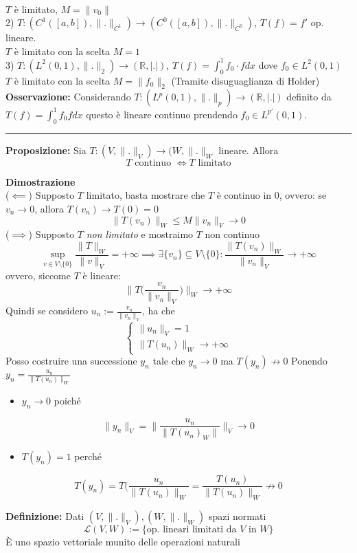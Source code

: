 \documentclass[a4paper]{article}
\newcommand{\R}{\mathbb{R}}
\newcommand{\divider}{\noindent\rule{\textwidth}{0.5pt}}
\begin{document}
\\$T$ è limitato, $M=\|v_0\|$ 
\\2) $T:(C^1([a,b]),\|.\|_{C^1})\to (C^0([a,b]),\|.\|_{C^0})$, $T(f)=f'$ op. lineare.
\\$T$ è limitato con la scelta $M=1$
\\3) $T:(L^{2}(0,1),\|.\|_2)\to (\R,|.|)$, $T(f)=\int_{0}^{1} f_0\cdot fdx $ dove $f_0\in L^{2}(0,1)$ 
\\$T$ è limitato con la scelta $M=\|f_0\|_2$ (Tramite disuguaglianza di Holder)
\\\textbf{Osservazione:} Considerando $T:(L^{p}(0,1),\|.\|_p)\to (\R,|.|)$ definito da $T(f)=\int_{0}^{1} f_0fdx $ questo è lineare continuo prendendo $f_0\in L^{p'}(0,1)$.
\\\divider
\begin{tcolorbox}
	\textbf{Proposizione: }Sia $T:(V,\|.\|_V)\to (W,\|.\|_W$ lineare. Allora 
	\[T\text{ continuo }\iff T \text{ limitato}\]
\end{tcolorbox}
\textbf{Dimostrazione} 
\\($\impliedby$) Supposto $T$ limitato, basta mostrare che $T$ è continuo in $0$, ovvero: se $v_n\to 0$, allora $T(v_n)\to T(0)=0$ 
\[\|T(v_n)\|_W\le M \|v_n\|_V\to 0\]
($\implies$) Supposto $T$ \emph{non limitato} e mostraimo $T$ non continuo
\[\sup_{v\in V\setminus \{0\} }\frac{\|T\|_W}{\|v\|_V}=+\infty\implies \exists \{v_n\} \subseteq  V\setminus \{0\} :\frac{\|T(v_n)\|_W}{\|v_n\|_V}\to +\infty\]
ovvero, siccome $T$ è lineare:
\[\|T\bigg(\frac{v_n}{\|v_n\|_V}\bigg)\|_W\to +\infty\]
Quindi se considero $u_n:= \frac{v_n}{\|v_n\|_V}$, ha che 
\[\begin{cases}
	\|u_n\|_V=1\\
	\|T(u_n)\|_W\to +\infty
\end{cases}\]
Posso costruire una successione $y_n$ tale che $y_n\to 0$ ma $T(y_n)\not \to 0$
Ponendo $y_n= \frac{u_n}{\|T(u_n)\|_W}$
\begin{itemize}
	\item $y_n\to 0$ poiché 
\end{itemize}
\[\|y_n\|_V=\|\frac{u_n}{\|T(u_n)_W\|}\|_V\to 0\]
\begin{itemize}
	\item $T(y_n)=1$ perché
\end{itemize}
\[T(y_n)=T( \frac{u_n}{\|T(u_n)\|_W}= \frac{T(u_n)}{\|T(u_n)\|_W}\not\to 0\]
\begin{tcolorbox}
	\textbf{Definizione: }Dati $(V,\|.\|_V),(W,\|.\|_W)$ spazi normati
	\[\mathcal L(V,W):=\{\text{op. lineari limitati da } V \text{ in }W\}\] 
	È uno spazio vettoriale munito delle operazioni naturali
\end{tcolorbox}
\end{document}
